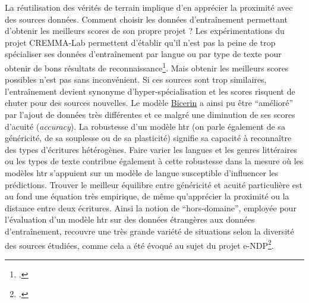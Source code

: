 \documentclass[a4paper,12pt,twoside]{book}
\begin{document}
		La réutilisation des vérités de terrain implique d'en apprécier la
		proximité avec des sources données. Comment choisir les données
		d'entraînement permettant d'obtenir les meilleurs scores de son propre
		projet ? Les expérimentations du projet CREMMA-Lab permettent d'établir
		qu'il n'est pas la peine de trop spécialiser ses données d'entraînement
		par langue ou par type de texte pour obtenir de bons résultats de
		reconnaissance\footcite{campsCremmaLabProjectsTranscription2022}. Mais
		obtenir les meilleurs scores possibles n'est pas sans inconvénient. Si
		ces sources sont trop similaires, l'entraînement devient synonyme
		d'hyper-spécialisation et les scores risquent de chuter pour des sources
		nouvelles. Le modèle
		\href{https://github.com/HTR-United/cremma-medieval/releases/tag/1.1.0}{Bicerin}
		a ainsi pu être ``amélioré'' par l'ajout de données très différentes et
		ce malgré une diminution de ses scores d'acuité (\textit{accuracy}). La
		robustesse d'un modèle \gls{htr} (on parle également de sa généricité, de sa
		souplesse ou de sa plasticité) signifie sa capacité à reconnaître des
		types d'écritures hétérogènes. Faire varier les langues et les genres
		littéraires ou les types de texte contribue également à cette robustesse
		dans la mesure où les modèles \gls{htr} s'appuient sur un modèle de langue
		susceptible d'influencer les \glspl{prédiction}. Trouver le meilleur équilibre
		entre généricité et acuité particulière est au fond une équation très
		empirique, de même qu'apprécier la proximité ou la distance entre deux
		écritures. Ainsi la notion de ``hors-domaine'', employée pour
		l'évaluation d'un modèle \gls{htr} sur des données étrangères aux données
		d'entraînement, recouvre une très grande variété de situations selon la
		diversité des sources étudiées, comme cela a été évoqué au sujet du
		projet e-NDP\footcite{torresaguilarModelisationAffinageHTR2022}.
		
\end{document}
